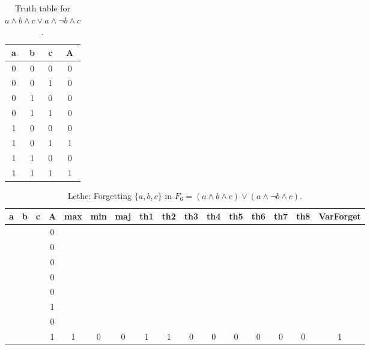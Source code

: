 \begin{table}[!tb]
    \centering
    \begin{tabular}{|c|c|c|c|}
        \hline
        \textbf{a} & \textbf{b} & \textbf{c} & \textbf{A} \\ \hline
        0 & 0 & 0 & 0 \\ \hline
        0 & 0 & 1 & 0 \\ \hline
        0 & 1 & 0 & 0 \\ \hline
        0 & 1 & 1 & 0 \\ \hline
        1 & 0 & 0 & 0 \\ \hline
        1 & 0 & 1 & 1 \\ \hline
        1 & 1 & 0 & 0 \\ \hline
        1 & 1 & 1 & 1 \\ \hline
    \end{tabular}
    \caption{Truth table for $a \land b \land c \lor a \land \lnot b \land c$.}
    \label{tab:truthtab}
\end{table}

\begin{table}[!tb]
    \centering
    \begin{tabular}{|c|c|c|c|c|c|c|c|c|c|c|c|c|c|c|c|}
        \hline
        \textbf{a} & \textbf{b} & \textbf{c} & \textbf{A} & \textbf{max} & \textbf{min} & \textbf{maj} & \textbf{th1} & \textbf{th2} & \textbf{th3} & \textbf{th4} & \textbf{th5} & \textbf{th6} & \textbf{th7} & \textbf{th8} & \textbf{VarForget} \\ \hline
        \rowcolor{gray!40}  &  &  & 0 &  &  &  &  &  &  &  &  &  &  &  &  \\ \hline
        \rowcolor{gray!40}  &  &  & 0 &  &  &  &  &  &  &  &  &  &  &  &  \\ \hline
        \rowcolor{gray!40}  &  &  & 0 &  &  &  &  &  &  &  &  &  &  &  &  \\ \hline
        \rowcolor{gray!40}  &  &  & 0 &  &  &  &  &  &  &  &  &  &  &  &  \\ \hline
        \rowcolor{gray!40}  &  &  & 0 &  &  &  &  &  &  &  &  &  &  &  &  \\ \hline
        \rowcolor{gray!40}  &  &  & 1 &  &  &  &  &  &  &  &  &  &  &  &  \\ \hline
        \rowcolor{gray!40}  &  &  & 0 &  &  &  &  &  &  &  &  &  &  &  &  \\ \hline
        \rowcolor{gray!40}  &  &  & 1 & 1 & 0 & 0 & 1 & 1 & 0 & 0 & 0 & 0 & 0 & 0 & 1 \\ \hline
    \end{tabular}
    \caption{Lethe: Forgetting $\{a, b, c\}$ in $F_{6} = (a \land b \land c) \lor (a \land \lnot b \land c)$.}
    \label{tab:lethe-F6-abc}
\end{table}
